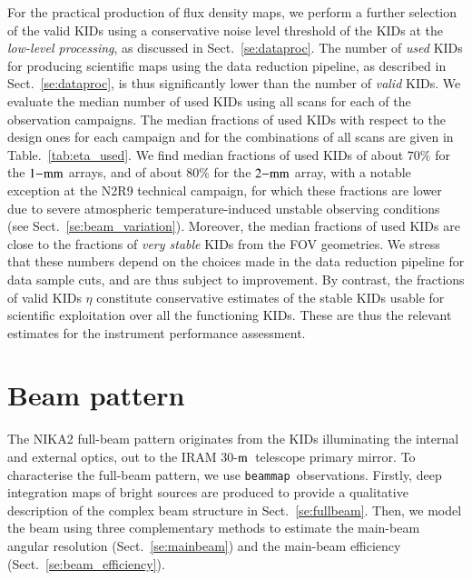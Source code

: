 \documentclass[traditionalabstract]{aa}
\newcommand{\bm}{{\tt beammap}}
\newcommand{\trentemetre}{30-$\rm{m}$}
\newcommand{\lp}[1]{#1}
\begin{document}
{For the practical production of flux density maps, we perform
a further selection of the valid KIDs using a conservative noise level
threshold of the KIDs at the \emph{low-level processing}, as discussed in
Sect.~\ref{se:dataproc}. The number of \emph{used} KIDs for producing
scientific maps using the data reduction pipeline, as described
in Sect.~\ref{se:dataproc}, is thus significantly lower than the number of
\emph{valid} KIDs. We evaluate the median number of used KIDs using all scans
for each of the observation campaigns. The median fractions of used
KIDs with respect to the design ones for each campaign and for the
combinations of all scans are given in Table.~\ref{tab:eta_used}. We
find median fractions of used KIDs of about $70\%$ for the
$1\rm{-mm}$ arrays, and of about $80\%$ for the $2\rm{-mm}$ array,
with a notable exception at the N2R9 technical campaign, for which
these fractions are lower due to severe {\lp atmospheric} temperature-induced
unstable observing conditions (see
Sect.~\ref{se:beam_variation}). Moreover, the median fractions of used
KIDs are close to the fractions of
\emph{very stable} KIDs from the FOV geometries. We stress that these numbers
depend on the choices made in the data reduction pipeline for data
sample cuts, and are thus subject to improvement. By contrast, the
fractions of valid KIDs $\eta$ constitute conservative estimates of the
stable KIDs usable for scientific exploitation over all the functioning
KIDs. These are thus the relevant estimates for the instrument
performance assessment.  
 
\section{Beam pattern}
\label{se:beam}
%

{\lp The NIKA2 full-beam pattern originates from the KIDs illuminating the internal
and external optics, out to the IRAM \trentemetre\ telescope primary mirror.}
To characterise the full-beam pattern, we use \bm\ observations. Firstly,
deep integration maps of bright sources are produced to provide a
qualitative description of the complex beam structure in
Sect.~\ref{se:fullbeam}. Then, we model the beam using three
complementary methods to estimate the main-beam angular resolution
(Sect.~\ref{se:mainbeam}) and the main-beam efficiency
(Sect.~\ref{se:beam_efficiency}).

}
\end{document}
